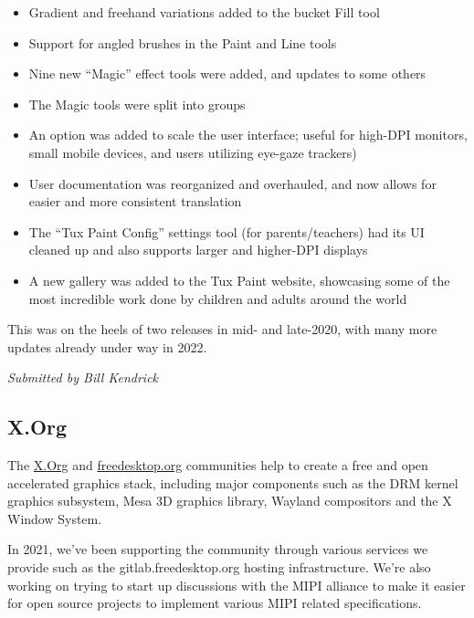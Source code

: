 \documentclass[a4paper]{report}
\begin{document}
\begin{itemize}

\item Gradient and freehand variations added to the bucket Fill tool

\item Support for angled brushes in the Paint and Line tools

\item Nine new ``Magic'' effect tools were added, and updates to some others

\item The Magic tools were split into groups

\item An option was added to scale the user interface; useful for high-DPI monitors, small mobile devices, and users utilizing eye-gaze trackers)

\item User documentation was reorganized and overhauled, and now allows for easier and more consistent translation

\item The ``Tux Paint Config'' settings tool (for parents/teachers) had its UI cleaned up and also supports larger and higher-DPI displays

\item A new gallery was added to the Tux Paint website, showcasing some of the most incredible work done by children and adults around the world

\end{itemize}

This was on the heels of two releases in mid- and late-2020, with many more updates already under way in 2022.

{\em Submitted by Bill Kendrick}

\subsection{X.Org}

The \href{https://www.x.org/}{X.Org} and \href{https://www.freedesktop.org}{freedesktop.org} communities help to create a free and open accelerated graphics stack, including major components such as the DRM kernel graphics subsystem, Mesa 3D graphics library, Wayland compositors and the X Window System.

In 2021, we've been supporting the community through various services we provide such as the gitlab.freedesktop.org hosting infrastructure. We're also working on trying to start up discussions with the MIPI alliance to make it easier for open source projects to implement various MIPI related specifications.
\end{document}
